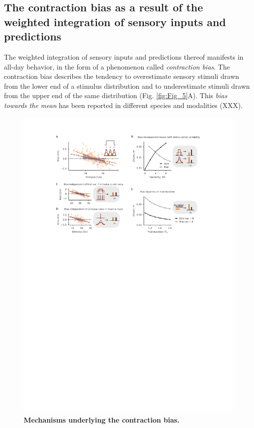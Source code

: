 \documentclass[10pt,a4paper,draft]{article}
\begin{document}
\subsection*{The contraction bias as a result of the weighted integration of sensory inputs and predictions}
% 
The weighted integration of sensory inputs and predictions thereof manifests in all-day behavior, in the form of a phenomenon called \textit{contraction bias}. The contraction bias describes the tendency to overestimate sensory stimuli drawn from the lower end of a stimulus distribution and to underestimate stimuli drawn from the upper end of the same distribution (Fig. \ref{fig:Fig_5}A). This \textit{bias towards the mean} has been reported in different species and modalities (XXX). 
%
\begin{figure}[t!]
	\centering
    \includegraphics{../results/figures/final/Fig_5}
\caption{\footnotesize{\bf Mechanisms underlying the contraction bias.\newline} 
}
\end{figure}
\end{document}
